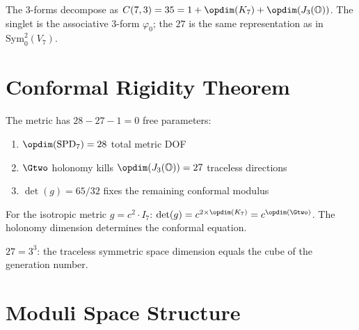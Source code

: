 \begin{theorem}[$\Lambda^3(V_7) = 1 \oplus 7 \oplus 27$]\label{thm:lambda3_decomp}
    \leanok
    The 3-forms decompose as $C(7,3) = 35 = 1 + \opdim(K_7) + \opdim(J_3(\mathbb{O}))$.
    The singlet is the associative 3-form $\varphi_0$; the $27$ is the same representation
    as in $\mathrm{Sym}^2_0(V_7)$.
\end{theorem}

\section{Conformal Rigidity Theorem}

\begin{theorem}\label{thm:conformal_rigidity}
    \leanok
    The metric has $28 - 27 - 1 = 0$ free parameters:
    \begin{enumerate}
        \item $\opdim(\mathrm{SPD}_7) = 28$ total metric DOF
        \item $\Gtwo$ holonomy kills $\opdim(J_3(\mathbb{O})) = 27$ traceless directions
        \item $\det(g) = 65/32$ fixes the remaining conformal modulus
    \end{enumerate}
\end{theorem}

\begin{theorem}[Conformal exponent = $\opdim(\Gtwo)$]\label{thm:conformal_exponent}
    \leanok
    For the isotropic metric $g = c^2 \cdot I_7$:
    $\det(g) = c^{2 \times \opdim(K_7)} = c^{\opdim(\Gtwo)}$.
    The holonomy dimension determines the conformal equation.
\end{theorem}

\begin{theorem}[$\opdim(J_3(\mathbb{O})) = N_{\mathrm{gen}}^3$]\label{thm:J3O_Ngen_cubed}
    \leanok
    $27 = 3^3$: the traceless symmetric space dimension equals the cube
    of the generation number.
\end{theorem}

\section{Moduli Space Structure}

